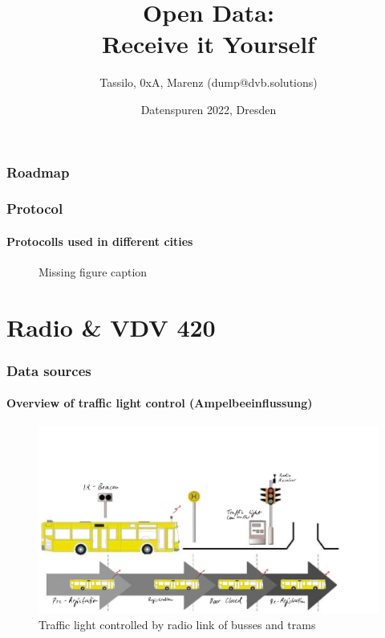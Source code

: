 \documentclass[aspectratio=169]{beamer}
\title{Open Data: \\ Receive it Yourself}
\date[ISPN ’80]{Datenspuren 2022, Dresden}
\author[]{Tassilo, 0xA, Marenz (dump@dvb.solutions)}
\begin{document}
\begin{frame}\titlepage
\end{frame}
  
\begin{frame} 
\frametitle{Roadmap} 

\tableofcontents

\end{frame}


\begin{frame}
\frametitle{Protocol}
\framesubtitle{Protocolls used in different cities}
\begin{figure}
\centering
\missingfigure[figwidth=7cm]{}
\caption{Missing figure caption}
\end{figure}
\end{frame}


\section{Radio \& VDV 420}


\begin{frame}
\frametitle{Data sources}
\framesubtitle{Overview of traffic light control (Ampelbeeinflussung)}
\begin{figure}
\centering
\includegraphics[height=0.65\textheight]{figs/lsa-beeinflussungs-stecke.pdf}
\caption{Traffic light controlled by radio link of busses and trams}
\end{figure}
\end{frame}
\end{document}
